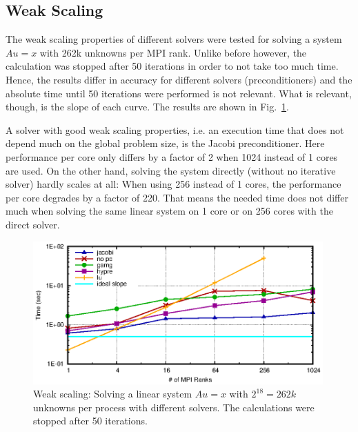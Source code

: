 
\subsection{Weak Scaling}

The weak scaling properties of different solvers were tested for solving a system $Au = x$ with 262k unknowns per MPI rank. Unlike before however, the calculation was stopped after 50 iterations in order to not take too much time. Hence, the results differ in accuracy for different solvers (preconditioners) and the absolute time until 50 iterations were performed is not relevant. What is relevant, though, is the slope of each curve. The results are shown in Fig.~\ref{fig:ex2_weak_time}. 

A solver with good weak scaling properties, i.e. an execution time that does not depend much on the global problem size, is the Jacobi preconditioner. Here performance per core only differs by a factor of 2 when 1024 instead of 1 cores are used. On the other hand, solving the system directly (without no iterative solver) hardly scales at all: When using 256 instead of 1 cores, the performance per core degrades by a factor of 220. That means the needed time does not differ much when solving the same linear system on 1 core or on 256 cores with the direct solver.

\begin{figure}[tb]
	\centering
	\includegraphics[width=0.99\textwidth]{ex2_weak_time}
	\caption{Weak scaling: Solving a linear system $Au = x$ with $2^{18} = 262k$ unknowns per process with different solvers. The calculations were stopped after 50 iterations.} 
	\label{fig:ex2_weak_time}
\end{figure}


